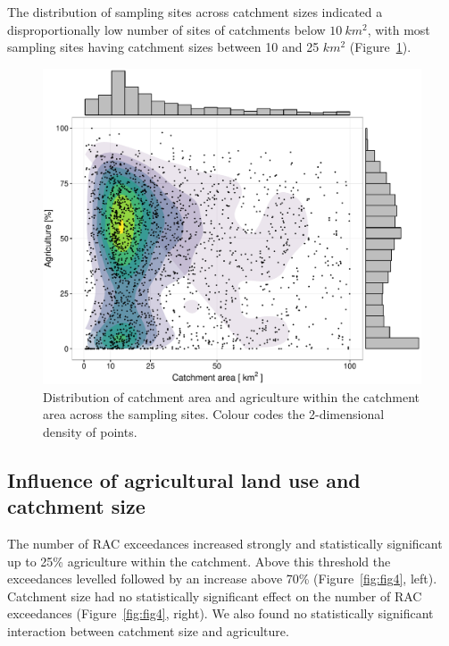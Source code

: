 \documentclass[journal=esthag,manuscript=article]{achemso}
\begin{document}

The distribution of sampling sites across catchment sizes indicated a disproportionally low number of sites of catchments below $10~km^2$, with
most sampling sites having catchment sizes between 10 and 25 $km^2$ (Figure~\ref{fig:fig3}). 


\begin{figure}[ht]
  \includegraphics[width=.8\textwidth]{figure3.pdf}
  \caption{Distribution of catchment area and agriculture within the catchment area across the sampling sites.
  Colour codes the 2-dimensional density of points.}
  \label{fig:fig3}
\end{figure}


\subsection{Influence of agricultural land use and catchment size}
The number of RAC exceedances increased strongly and statistically significant up to 25\% agriculture within the catchment.
Above this threshold the exceedances levelled followed by an increase above 70\% (Figure~\ref{fig:fig4}, left).
Catchment size had no statistically significant effect on the number of RAC exceedances (Figure~\ref{fig:fig4}, right).
We also found no statistically significant interaction between catchment size and agriculture.
\end{document}
